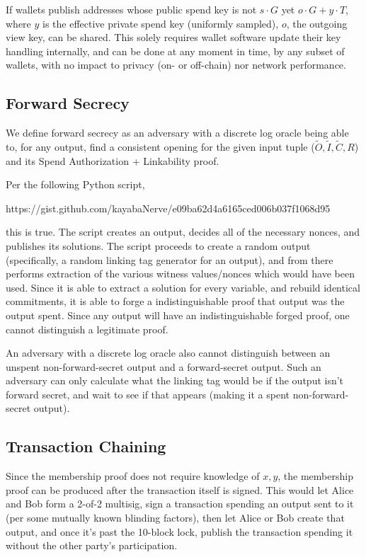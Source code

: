 \documentclass[]{article}
\begin{document}
If wallets publish addresses whose public spend key is not $s \cdot G$ yet $o \cdot G + y \cdot T$, where $y$ is the effective private spend key (uniformly sampled), $o$, the outgoing view key, can be shared. This solely requires wallet software update their key handling internally, and can be done at any moment in time, by any subset of wallets, with no impact to privacy (on- or off-chain) nor network performance.

\subsection{Forward Secrecy}

We define forward secrecy as an adversary with a discrete log oracle being able to, for any output, find a consistent opening for the given input tuple ($\tilde{O}, \tilde{I}, \tilde{C}, R$) and its Spend Authorization + Linkability proof.

Per the following Python script,

https://gist.github.com/kayabaNerve/e09ba62d4a6165ced006b037f1068d95

this is true. The script creates an output, decides all of the necessary nonces, and publishes its solutions. The script proceeds to create a random output (specifically, a random linking tag generator for an output), and from there performs extraction of the various witness values/nonces which would have been used. Since it is able to extract a solution for every variable, and rebuild identical commitments, it is able to forge a indistinguishable proof that output was the output spent. Since any output will have an indistinguishable forged proof, one cannot distinguish a legitimate proof.

An adversary with a discrete log oracle also cannot distinguish between an unspent non-forward-secret output and a forward-secret output. Such an adversary can only calculate what the linking tag would be if the output isn't forward secret, and wait to see if that appears (making it a spent non-forward-secret output).

\subsection{Transaction Chaining}

Since the membership proof does not require knowledge of $x, y$, the membership proof can be produced after the transaction itself is signed. This would let Alice and Bob form a 2-of-2 multisig, sign a transaction spending an output sent to it (per some mutually known blinding factors), then let Alice or Bob create that output, and once it's past the 10-block lock, publish the transaction spending it without the other party's participation.
\end{document}
